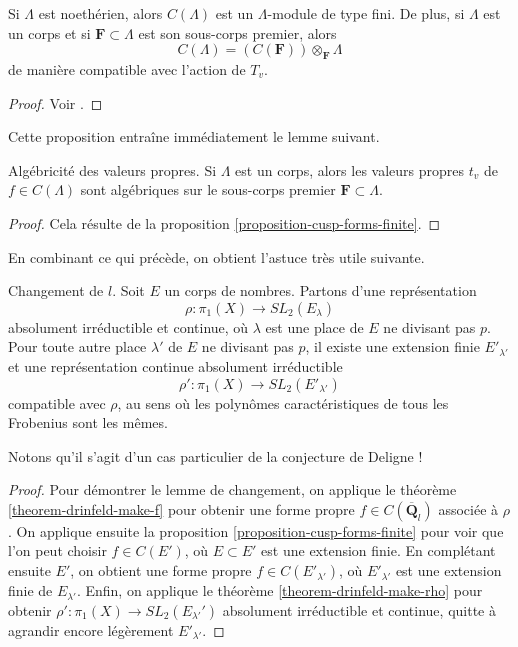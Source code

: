 \begin{proposition}
\label{proposition-cusp-forms-finite}
Si $\Lambda$ est noethérien, alors $C(\Lambda)$ est un
$\Lambda$-module de type fini. De plus, si $\Lambda$ est un corps et si
$\mathbf{F} \subset \Lambda$ est son sous-corps premier, alors
$$
C(\Lambda)=(C(\mathbf{F}))\otimes_{\mathbf{F}}\Lambda
$$
de manière compatible avec l'action de $T_v$.
\end{proposition}

\begin{proof}
Voir \cite[Proposition 4.7]{dJ-conjecture}.
\end{proof}

\noindent
Cette proposition entraîne immédiatement le lemme suivant.

\begin{lemma}
\label{lemma-eigenvalues-algebraic}
Algébricité des valeurs propres.
Si $\Lambda$ est un corps, alors les valeurs propres $t_v$ de $f\in
C(\Lambda)$ sont algébriques sur le sous-corps premier
$\mathbf{F} \subset \Lambda$.
\end{lemma}

\begin{proof}
Cela résulte de la proposition \ref{proposition-cusp-forms-finite}.
\end{proof}

\noindent
En combinant ce qui précède, on obtient l'astuce très utile suivante.

\begin{lemma}
\label{lemma-switch-l}
Changement de $l$. Soit $E$ un corps de nombres.
Partons d'une représentation
$$
\rho : \pi_1(X)\to SL_2(E_\lambda)
$$
absolument irréductible et continue, où $\lambda$ est une place de $E$
ne divisant pas $p$. Pour toute autre place $\lambda'$ de $E$
ne divisant pas $p$, il existe une extension finie $E'_{\lambda'}$
et une représentation continue absolument irréductible
$$
\rho': \pi_1(X)\to SL_2(E'_{\lambda'})
$$
compatible avec $\rho$, au sens où les polynômes caractéristiques
de tous les Frobenius sont les mêmes.
\end{lemma}

\noindent
Notons qu'il s'agit d'un cas particulier de la conjecture de Deligne !

\begin{proof}
Pour démontrer le lemme de changement, on applique
le théorème \ref{theorem-drinfeld-make-f}
pour obtenir une forme propre $f\in C(\overline{\mathbf{Q}}_l)$ associée à $\rho$.
On applique ensuite
la proposition \ref{proposition-cusp-forms-finite}
pour voir que l'on peut choisir $f\in C(E')$, où $E \subset E'$ est une extension finie.
En complétant ensuite $E'$, on obtient
une forme propre $f\in C(E'_{\lambda'})$, où
$E'_{\lambda'}$ est une extension finie de $E_{\lambda'}$.
Enfin, on applique
le théorème \ref{theorem-drinfeld-make-rho}
pour obtenir
$\rho': \pi_1(X) \to SL_2(E_{\lambda'}')$ absolument irréductible et continue,
quitte à agrandir encore légèrement $E'_{\lambda'}$.
\end{proof}

